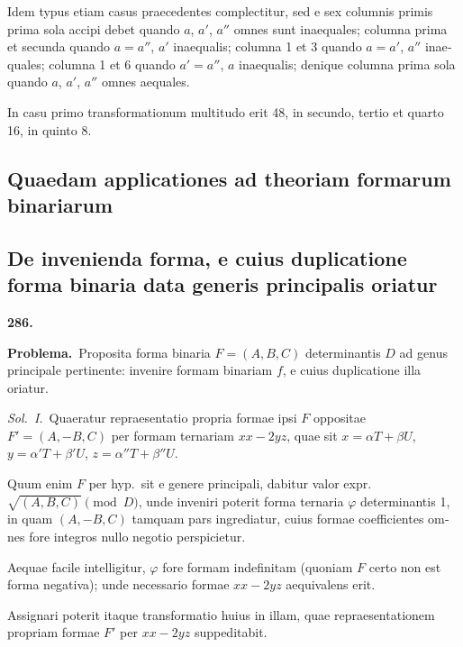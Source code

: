 \documentclass[12pt,a4paper]{article}
\theoremstyle{plain}
\theoremstyle{definition}
\theoremstyle{remark}
\begin{document}
\begin{otherlanguage}{latin}
Idem typus etiam casus praecedentes complectitur, sed e sex columnis primis prima sola accipi debet quando $a$, $a'$, $a''$ omnes sunt inaequales; columna prima et secunda quando $a = a''$, $a'$ inaequalis; columna 1 et 3 quando $a = a'$, $a''$ inaequales; columna 1 et 6 quando $a' = a''$, $a$ inaequalis; denique columna prima sola quando $a$, $a'$, $a''$ omnes aequales.

In casu primo transformationum multitudo erit 48, in secundo, tertio et quarto 16, in quinto 8.

\end{otherlanguage}

\begin{otherlanguage}{latin}

\section*{Quaedam applicationes ad theoriam formarum binariarum}

\subsection*{De invenienda forma, e cuius duplicatione forma binaria data generis principalis oriatur}

\textbf{286.}

\textbf{Problema.}\ Proposita forma binaria $F = (A, B, C)$ determinantis $D$ ad genus principale pertinente: invenire formam binariam $f$, e cuius duplicatione illa oriatur.

\textit{Sol.}\ \textit{I.}\ Quaeratur repraesentatio propria formae ipsi $F$ oppositae $F' = (A, -B, C)$ per formam ternariam $xx - 2yz$, quae sit $x = \alpha T + \beta U$, $y = \alpha' T + \beta' U$, $z = \alpha'' T + \beta'' U$.

Quum enim $F$ per hyp.\ sit e genere principali, dabitur valor expr.\ $\sqrt{(A, B, C)} \pmod{D}$, unde inveniri poterit forma ternaria $\varphi$ determinantis 1, in quam $(A, -B, C)$ tamquam pars ingrediatur, cuius formae coefficientes omnes fore integros nullo negotio perspicietur.

Aequae facile intelligitur, $\varphi$ fore formam indefinitam (quoniam $F$ certo non est forma negativa); unde necessario formae $xx - 2yz$ aequivalens erit.

Assignari poterit itaque transformatio huius in illam, quae repraesentationem propriam formae $F'$ per $xx - 2yz$ suppeditabit.


\end{otherlanguage}
\end{document}
